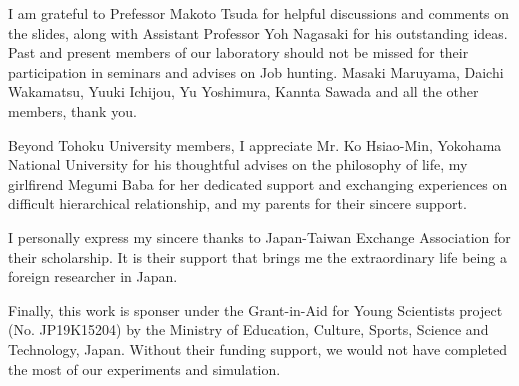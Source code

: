 I am grateful to Prefessor Makoto Tsuda for helpful discussions and comments on the slides,
along with Assistant Professor Yoh Nagasaki for his outstanding ideas.
Past and present members of our laboratory should not be missed for their participation in seminars and advises on Job hunting.
Masaki Maruyama, Daichi Wakamatsu, Yuuki Ichijou, Yu Yoshimura, Kannta Sawada and all the other members, thank you.

Beyond Tohoku University members,
I appreciate Mr. Ko Hsiao-Min, Yokohama National University for his thoughtful advises on the philosophy of life,
my girlfirend Megumi Baba for her dedicated support and exchanging experiences on difficult hierarchical relationship,
and my parents for their sincere support.

I personally express my sincere thanks to Japan-Taiwan Exchange Association for their scholarship.
It is their support that brings me the extraordinary life being a foreign researcher in Japan.

Finally, this work is sponser under the Grant-in-Aid for Young Scientists project (No. JP19K15204) by the Ministry of Education, Culture, Sports, Science and Technology, Japan.
Without their funding support,
we would not have completed the most of our experiments and simulation.
